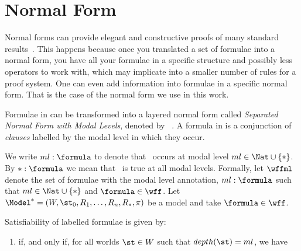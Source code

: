 

\section{Normal Form}

Normal forms can provide elegant and constructive proofs of many standard
results~\cite{fine1975}. This happens because once you translated a set of
formulae into a normal form, you have all your formulae in a specific structure
and possibly less operators to work with, which may implicate into a smaller number
of rules for a proof system. One can even add information into formulae in a
specific normal form. That is the case of the normal form we use in this work.

Formulae in  can be transformed into a layered normal form called
\emph{Separated Normal Form with Modal Levels}, denoted by
~\cite{journals/jal/NalonD07}. A formula in  is a
conjunction of \emph{clauses} labelled by the modal level in which they occur.

We write $ml: \formula$ to denote that \formula~occurs at modal level $ml\in
\Nat \cup \{*\}$. By $*: \formula$ we mean that \formula~is true at
all modal levels. Formally, let $\wffml$ denote the set of formulae with
the modal level annotation, $ml : \formula$ such that $ml \in \Nat \cup \{*\}$
and $\formula \in \wff$. Let $\Model^* = (W, \st_0, R_1, \ldots, R_n, R_*, \pi)$
be a model and take $\formula \in \wff$. 

\begin{definition}
Satisfiability of labelled formulae is given by:

\begin{enumerate}
    \item {} if, and only if, for all worlds
        $\st \in W$ such that $depth(\st) = ml$, we have
        \sat{\Model^*}{\st}{\formula} 
\end{enumerate}
    
\end{definition}
